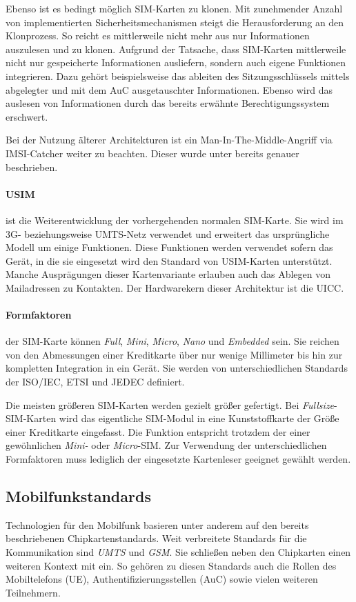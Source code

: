 Ebenso ist es bedingt möglich SIM-Karten zu klonen. Mit zunehmender Anzahl von implementierten
Sicherheitsmechanismen steigt die Herausforderung an den Klonprozess. So reicht es mittlerweile
nicht mehr aus nur Informationen auszulesen und zu klonen.
Aufgrund der Tatsache, dass SIM-Karten mittlerweile nicht nur gespeicherte Informationen
ausliefern, sondern auch eigene Funktionen integrieren.
Dazu gehört beispielsweise das ableiten des Sitzungsschlüssels
mittels abgelegter und mit dem \ac{AuC} ausgetauschter Informationen. Ebenso wird das auslesen
von Informationen durch das bereits erwähnte Berechtigungssystem erschwert.

Bei der Nutzung älterer Architekturen ist ein Man-In-The-Middle-Angriff via IMSI-Catcher weiter
zu beachten. Dieser wurde unter  bereits genauer beschrieben.

\paragraph{\ac{USIM}} ist die Weiterentwicklung der vorhergehenden normalen \ac{SIM}-Karte. Sie wird
im 3G- beziehungsweise UMTS-Netz verwendet und erweitert das ursprüngliche Modell um einige Funktionen.
Diese Funktionen werden verwendet sofern das Gerät, in die sie eingesetzt wird den Standard
von USIM-Karten unterstützt. Manche Ausprägungen dieser Kartenvariante erlauben auch das Ablegen
von Mailadressen zu Kontakten. Der Hardwarekern dieser Architektur ist die \ac{UICC}.

\paragraph{Formfaktoren} der SIM-Karte können \textit{Full}, \textit{Mini}, \textit{Micro},
\textit{Nano} und \textit{Embedded} sein. Sie reichen von den Abmessungen einer Kreditkarte über
nur wenige Millimeter bis hin zur kompletten Integration in ein Gerät. Sie werden von unterschiedlichen
Standards der ISO/IEC, ETSI und JEDEC definiert.

Die meisten größeren SIM-Karten werden gezielt größer gefertigt. Bei \textit{Fullsize}-SIM-Karten
wird das eigentliche SIM-Modul in eine Kunststoffkarte der Größe einer Kreditkarte eingefasst.
Die Funktion entspricht trotzdem der einer gewöhnlichen \textit{Mini-} oder \textit{Micro}-SIM.
Zur Verwendung der unterschiedlichen Formfaktoren muss lediglich der eingesetzte Kartenleser
geeignet gewählt werden.

\subsection{Mobilfunkstandards} %
Technologien für den Mobilfunk basieren unter anderem auf den bereits beschriebenen
Chipkartenstandards. Weit verbreitete Standards für die Kommunikation sind
\textit{UMTS} und \textit{GSM}. Sie schließen neben den Chipkarten einen weiteren
Kontext mit ein. So gehören zu diesen Standards auch die Rollen des Mobiltelefons (UE),
Authentifizierungsstellen (\ac{AuC}) sowie vielen weiteren Teilnehmern.

